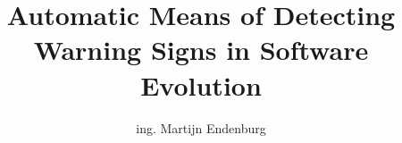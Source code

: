 \documentclass{uvamscse}
\title{Automatic Means of Detecting Warning Signs in Software Evolution}
\author{ing. Martijn Endenburg}
\begin{document}
\maketitle










{}


\end{document}
